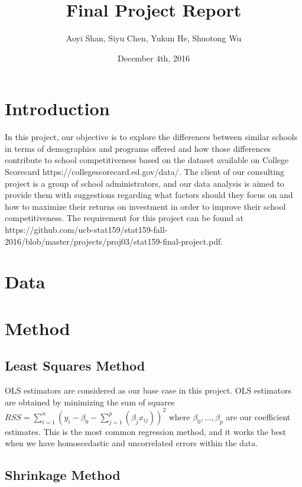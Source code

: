 \documentclass{article}
\title{Final Project Report}
\author{Aoyi Shan, Siyu Chen, Yukun He, Shuotong Wu}
\date{December 4th, 2016}
\begin{document}


\maketitle

\section{Introduction}

In this project, our objective is to explore the differences between similar schools in terms of demographics and programs offered and how those differences contribute to school competitiveness based on the dataset available on College Scorecard https://collegescorecard.ed.gov/data/. The client of our consulting project is a group of school administrators, and our data analysis is aimed to provide them with suggestions regarding what factors should they focus on and how to maximize their returns on investment in order to improve their school competitiveness. The requirement for this project can be found at https://github.com/ucb-stat159/stat159-fall-2016/blob/master/projects/proj03/stat159-final-project.pdf.

\section{Data}



\section{Method}

\subsection{Least Squares Method}

OLS estimators are considered as our base case in this project. OLS estimators are obtained by minimizing the sum of squares $RSS = \sum_{i=1}^n(y_i - \beta_0 - \sum_{j=1}^p(\beta_{j}x_{ij}))^2$ where $\beta_0, ..., \beta_p$ are our coefficient estimates. This is the most common regression method, and it works the best when we have homoscedastic and uncorrelated errors within the data.

\subsection{Shrinkage Method}
\end{document}
